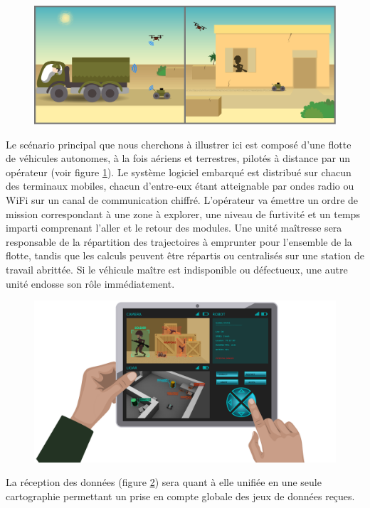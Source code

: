   \begin{figure}[h]
    \centering
      \includegraphics[width=1.\linewidth]{figures/ml_collage}  
    \label{fig:srt2M-1}
  \end{figure}
  
  Le scénario principal que nous cherchons à illustrer ici est composé d'une flotte de véhicules autonomes, à la fois aériens et terrestres, pilotés à distance par un opérateur (voir figure \ref{fig:srt2M-1}). 
  Le système logiciel embarqué est distribué sur chacun des terminaux mobiles, chacun d'entre-eux étant atteignable par ondes radio ou WiFi sur un canal de communication chiffré. 
  L'opérateur va émettre un ordre de mission correspondant à une zone à explorer, une niveau de furtivité et un temps imparti comprenant l'aller et le retour des modules.
  Une unité maîtresse sera responsable de la répartition des trajectoires à emprunter pour l'ensemble de la flotte, tandis que les calculs peuvent être répartis ou centralisés sur une station de travail abrittée.
  Si le véhicule maître est indisponible ou défectueux, une autre unité endosse son rôle immédiatement. 
    \begin{figure}[h]
    \centering
      \includegraphics[width=1.\linewidth]{figures/ml_4}  
    \label{fig:srt2M-2}
  \end{figure}
  La réception des données (figure \ref{fig:srt2M-2}) sera quant à elle unifiée en une seule cartographie permettant un prise en compte globale des jeux de données reçues. 
  
